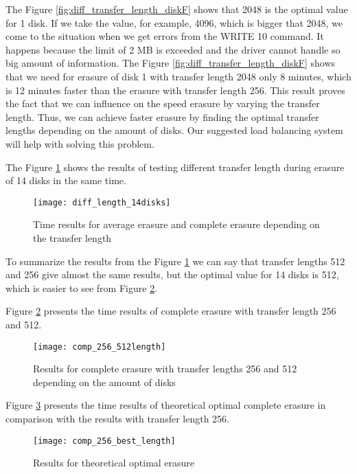 The Figure \ref{fig:diff_transfer_length_diskF} shows that 2048 is the optimal value for 1 disk. If we take the value, for example, 4096, which is bigger that 2048, we come to the situation when we get errors from the WRITE 10 command. It happens because the limit of 2 MB is exceeded and the driver cannot handle so big amount of information. The Figure \ref{fig:diff_transfer_length_diskF} shows that  we need for erasure of disk 1 with transfer length 2048 only 8 minutes, which is 12 minutes faster than the erasure with transfer length 256. This result proves the fact that we can influence on the speed erasure by varying the transfer length. Thus, we can achieve faster erasure by finding the optimal transfer lengths depending on the amount of disks. Our suggested load balancing system will help with solving this problem.

The Figure \ref{fig:diff_length_14disks} shows the results of testing different transfer length during erasure of 14 disks in the same time.

\begin{figure}[h!]
\begin{center}
  \texttt{[image: diff\_length\_14disks]}
\end{center}
  \caption{Time results for average erasure and complete erasure depending on the transfer length}
  \label{fig:diff_length_14disks}
\end{figure}

To summarize the results from the Figure \ref{fig:diff_length_14disks} we can say that transfer lengths 512 and 256 give almost the same results, but the optimal value for 14 disks is 512, which is easier to see from Figure \ref{fig:comp_256_512length}. 

Figure \ref{fig:comp_256_512length} presents the time results of complete erasure with transfer length 256 and 512.
\begin{figure}[h!]
\begin{center}
  \texttt{[image: comp\_256\_512length]}
\end{center}
  \caption{Results for complete erasure with transfer lengths 256 and 512 depending on the amount of disks}
  \label{fig:comp_256_512length}
\end{figure}

\newpage
Figure \ref{fig:comp_256_best_length} presents the time results of theoretical optimal complete erasure in comparison with the results with transfer length 256.

\begin{figure}[h!]
\begin{center}
  \texttt{[image: comp\_256\_best\_length]}
\end{center}
  \caption{Results for theoretical optimal erasure}
  \label{fig:comp_256_best_length}
\end{figure}

